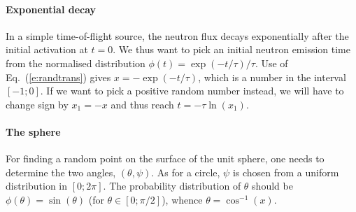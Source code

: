 \paragraph{Exponential decay}
In a simple time-of-flight source, the neutron flux decays exponentially
after the initial activation at $t=0$. We thus want to pick an initial
neutron emission time from the normalised distribution
$\phi(t) = \exp(-t/\tau) / \tau$.
Use of Eq.~(\ref{e:randtrans}) gives
$x = - \exp(-t/\tau)$, which is a number in the interval $[-1; 0]$.
If we want to pick a positive random number instead, we will have
to change sign by $x_1 = -x$ and thus reach $t = - \tau \ln (x_1)$.


\paragraph{The sphere}
For finding a random point on the surface of the unit sphere,
one needs to determine the two angles, $(\theta, \psi)$.
As for a circle, $\psi$ is chosen from a uniform distribution
in $[0; 2\pi]$. The probability distribution of $\theta$ should be
$\phi(\theta)=\sin(\theta)$ (for $\theta \in [0; \pi/2 ]$),
whence $\theta=\cos^{-1}(x)$.

